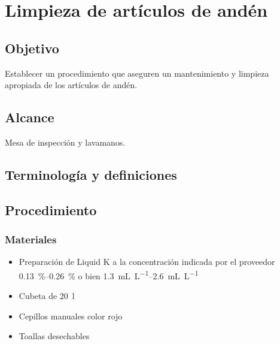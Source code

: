 \thispagestyle{formato-PI}
\renewcommand{\MayorVer}{2}
\renewcommand{\MenorVer}{0}
\renewcommand{\Titulo}{Limpieza de artículos de andén}
\renewcommand{\Codigo}{HYS-6-IT}
\renewcommand{\FechaPub}{2023--01}

\section{\Titulo}

\subsection{Objetivo}

Establecer un procedimiento que aseguren un mantenimiento y limpieza apropiada de los artículos de andén.

\subsection{Alcance}

Mesa de inspección y lavamanos.

\subsection{Terminología y definiciones}

\begin{description}
\end{description}

\subsection{Procedimiento}

\subsubsection{Materiales}

\begin{itemize}
	\item Preparación de Liquid K a la concentración indicada por el proveedor \qtyrange{0.13}{0.26}{\percent} o bien \qtyrange{1.3}{2.6}{\milli\liter\per\liter}
	\item Cubeta de \qty{20}{\litre}
	\item Cepillos manuales color rojo
	\item Toallas desechables
\end{itemize}

